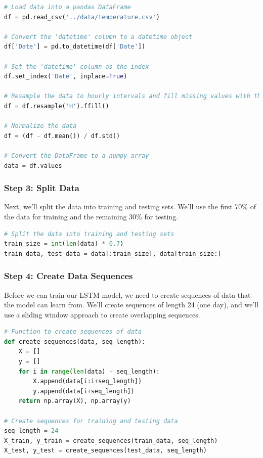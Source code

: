 \begin{lstlisting}[language=Python]
# Load data into a pandas DataFrame
df = pd.read_csv('../data/temperature.csv')

# Convert the 'datetime' column to a datetime object
df['Date'] = pd.to_datetime(df['Date'])

# Set the 'datetime' column as the index
df.set_index('Date', inplace=True)

# Resample the data to hourly intervals and fill missing values with the previous value
df = df.resample('H').ffill()

# Normalize the data
df = (df - df.mean()) / df.std()

# Convert the DataFrame to a numpy array
data = df.values
\end{lstlisting}

\subsubsection{Step 3: Split Data}\label{step-3-split-data}

Next, we'll split the data into training and testing sets. We'll use the
first 70\% of the data for training and the remaining 30\% for testing.

\begin{lstlisting}[language=Python]
# Split the data into training and testing sets
train_size = int(len(data) * 0.7)
train_data, test_data = data[:train_size], data[train_size:]
\end{lstlisting}

\subsubsection{Step 4: Create Data
Sequences}\label{step-4-create-data-sequences}

Before we can train our LSTM model, we need to create sequences of data
that the model can learn from. We'll create sequences of length 24 (one
day), and we'll use a sliding window approach to create overlapping
sequences.

\begin{lstlisting}[language=Python]
# Function to create sequences of data
def create_sequences(data, seq_length):
    X = []
    y = []
    for i in range(len(data) - seq_length):
        X.append(data[i:i+seq_length])
        y.append(data[i+seq_length])
    return np.array(X), np.array(y)

# Create sequences for training and testing data
seq_length = 24
X_train, y_train = create_sequences(train_data, seq_length)
X_test, y_test = create_sequences(test_data, seq_length)
\end{lstlisting}

